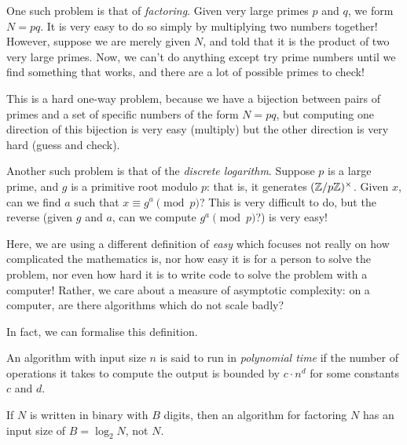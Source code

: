 \documentclass{article}
\begin{document}
\begin{remark}
	\label{one-way-mathematical-problems}
    One such problem is that of \textit{factoring}. Given very large primes $p$ and $q$, we form $N = pq$. It is very easy to do so simply by multiplying two numbers together! However, suppose we are merely given $N$, and told that it is the product of two very large primes. Now, we can't do anything except try prime numbers until we find something that works, and there are a lot of possible primes to check!
    
    This is a hard one-way problem, because we have a bijection between pairs of primes and a set of specific numbers of the form $N = pq$, but computing one direction of this bijection is very easy (multiply) but the other direction is very hard (guess and check).
    
    Another such problem is that of the \textit{discrete logarithm}. Suppose $p$ is a large prime, and $g$ is a primitive root modulo $p$: that is, it generates $(\mathbb{Z}/p\mathbb{Z})^\times$. Given $x$, can we find $a$ such that $x \equiv g^a \pmod p$? This is very difficult to do, but the reverse (given $g$ and $a$, can we compute $g^a \pmod p$?) is very easy!
    
    Here, we are using a different definition of \textit{easy} which focuses not really on how complicated the mathematics is, nor how easy it is for a person to solve the problem, nor even how hard it is to write code to solve the problem with a computer! Rather, we care about a measure of asymptotic complexity: on a computer, are there algorithms which do not scale badly?
\end{remark}

In fact, we can formalise this definition.

\begin{definition}
    An algorithm with input size $n$ is said to run in \textit{polynomial time} if the number of operations it takes to compute the output is bounded by $c \cdot n^d$ for some constants $c$ and $d$.
\end{definition}

\begin{note}
	If $N$ is written in binary with $B$ digits, then an algorithm for factoring $N$ has an input size of $B = \log_2 N$, not $N$.
\end{note}
\end{document}
